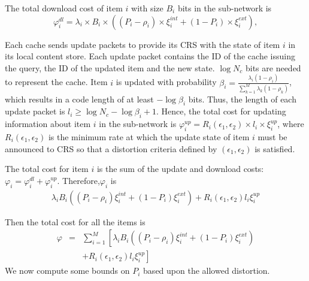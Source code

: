 \documentclass[conference]{IEEEtran}
\theoremstyle{plain}
\theoremstyle{remark}
\begin{document}
The total download cost of item $i$ with size $B_i$ bits in the sub-network is
\begin{equation}
\varphi^{dl}_i = \lambda_i \times B_i \times ((P_i-\rho_i) \times \xi^{int}_i + (1-P_i) \times \xi^{ext}_i),
\end{equation}

Each cache sends update packets to provide its CRS with the state of item $i$ in its local content store. Each update packet contains the ID of the cache issuing the query, the ID of the updated item and the new state. $\log N_c$ bits are needed to represent the cache. Item $i$ is updated with probability $\beta_i=\frac{\lambda_i(1-\rho_i)}{\sum_{k=1}^M\lambda_k(1-\rho_k)}$, which results in a code length of at least $-\log \beta_i$ bits. Thus, the length of each update packet is $l_i\geq \log N_c-\log \beta_i +1$. Hence, the total cost for updating information about item $i$ in the sub-network is $\varphi^{up}_i = R_i(\epsilon_1,\epsilon_2) \times l_i \times \xi^{up}_i$, where $R_i(\epsilon_1,\epsilon_2)$ is the minimum rate at which the update state of item $i$ must be announced to CRS so that a distortion criteria defined by $(\epsilon_1,\epsilon_2)$ is satisfied.

The total cost for item $i$ is the sum of the update and download costs: $\varphi_i =\varphi^{dl}_i + \varphi^{up}_i$. Therefore,$\varphi_i$ is
\begin{eqnarray}
\lambda_i B_i  ((P_i-\rho_i) \xi^{int}_i + (1-P_i) \xi^{ext}_i) + R_i(\epsilon_1,\epsilon_2) l_i \xi^{up}_i
\end{eqnarray}

Then the total cost for all the items is
\begin{eqnarray}
\varphi &=& \sum_{i=1}^M\left[\lambda_i B_i \left((P_i-\rho_i)\xi^{int}_i + (1-P_i)\xi^{ext}_i\right) \right.\nonumber\\ 
& & \left. + R_i(\epsilon_1,\epsilon_2)l_i \xi^{up}_i \right] \label{eq:totcost}
\end{eqnarray}
We now compute some bounds on $P_i$ based upon the allowed distortion.
\end{document}
